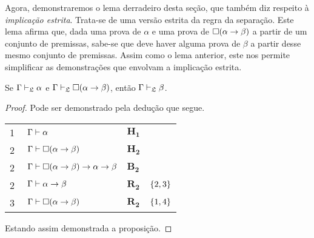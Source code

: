     \vspace{.5\baselineskip}
    Agora, demonstraremos o lema derradeiro desta seção, que também diz respeito à \emph{implicação estrita}.
    Trata-se de uma versão estrita da regra da separação.
    Este lema afirma que, dada uma prova de $\alpha$ e uma prova de $\Box(\alpha\to\beta)$ a partir de um conjunto de premissas, sabe-se que deve haver alguma prova de $\beta$ a partir desse mesmo conjunto de premissas.
    Assim como o lema anterior, este nos permite simplificar as demonstrações que envolvam a implicação estrita.
    \vspace{.5\baselineskip}
    \begin{tcolorbox}[enhanced jigsaw, breakable, sharp corners, colframe=black, colback=white, boxrule=0.5pt, left=1.5mm, right=1.5mm, top=1.5mm, bottom=1.5mm]
    \begin{lemma}\label{strict.detachment}
        Se $\Gamma\mathrel{\vdash}_{\mathfrak{L}}\alpha$ e $\Gamma\mathrel{\vdash}_{\mathfrak{L}}\Box(\alpha\to\beta)$, então $\Gamma\mathrel{\vdash}_{\mathfrak{L}}\beta$.
        \begin{proof}
            Pode ser demonstrado pela dedução que segue.

            \vspace{0.5\baselineskip}
            \footnotesize
            \setlength{\rowskip}{0.5\baselineskip}
            \begin{xltabular}{\textwidth}{r | X l l}
                \scriptsize{\phantom{0}1}\phantom{ } & $\ \Gamma\entails\alpha$                                & $\mathbf{H_1}$\phantom{1}                      & \\[\rowskip]
                \scriptsize{\phantom{0}2}\phantom{ } & $\ \Gamma\entails\nec(\alpha\to\beta)$                  & $\mathbf{H_2}$                                 & \\[\rowskip]
                \scriptsize{\phantom{0}2}\phantom{ } & $\ \Gamma\entails\nec(\alpha\to\beta)\to\alpha\to\beta$ & $\hyperref[modal.axiom.modal.2]{\mathbf{B_2}}$ & \\[\rowskip]
                \scriptsize{\phantom{0}2}\phantom{ } & $\ \Gamma\entails\alpha\to\beta$                        & $\hyperref[modal.rule.2]{\mathbf{R_2}}$        & $\left\{2,3\right\}$\\[\rowskip]
                \scriptsize{\phantom{0}3}\phantom{ } & $\ \Gamma\entails\nec(\alpha\to\beta)$                  & $\hyperref[modal.rule.2]{\mathbf{R_2}}$        & $\left\{1,4\right\}$
            \end{xltabular}
            \normalsize

            \vspace{0.5\baselineskip}
            Estando assim demonstrada a proposição.
        \end{proof}
    \end{lemma}
    \end{tcolorbox}

